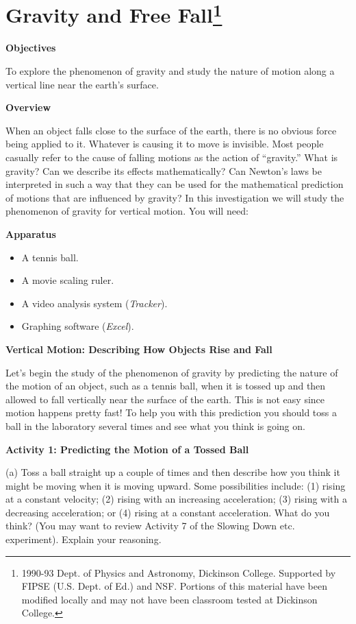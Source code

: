 
\section{Gravity and Free Fall\footnote{
1990-93 Dept. of Physics and Astronomy, Dickinson College. Supported by FIPSE
(U.S. Dept. of Ed.) and NSF. Portions of this material have been modified locally
and may not have been classroom tested at Dickinson College.
}}

\makelabheader %

\textbf{Objectives }

To explore the phenomenon of gravity and study the nature of motion along a
vertical line near the earth's surface.

\textbf{Overview }

When an object falls close to the surface of the earth, there is no obvious
force being applied to it. Whatever is causing it to move is invisible. Most
people casually refer to the cause of falling motions as the action of 
``gravity.''
What is gravity? Can we describe its effects mathematically? Can Newton's laws
be interpreted in such a way that they can be used for the mathematical prediction
of motions that are influenced by gravity? In this investigation we will study
the phenomenon of gravity for vertical motion. You will need:

\textbf{Apparatus}

\begin{itemize}
\item A tennis ball. 
\item A movie scaling ruler.
\item A video analysis system (\textit{Tracker}). 
\item Graphing software (\textit{Excel}).
\end{itemize}
\textbf{Vertical Motion: Describing How Objects Rise and Fall }

Let's begin the study of the phenomenon of gravity by predicting the nature
of the motion of an object, such as a tennis ball, when it is tossed up and
then allowed to fall vertically near the surface of the earth. This is not easy
since motion happens pretty fast! To help you with this prediction you should
toss a ball in the laboratory several times and see what you think is going
on.

\textbf{Activity 1: Predicting the Motion of a Tossed Ball }

(a) Toss a ball straight up a couple of times and then describe how you think
it might be moving when it is moving upward. Some possibilities include: (1)
rising at a constant velocity; (2) rising with an increasing acceleration; (3)
rising with a decreasing acceleration; or (4) rising at a constant acceleration. 
What do you think? (You may want to review Activity 7 of the Slowing Down etc. 
experiment). Explain your reasoning.
\vspace{20mm}


